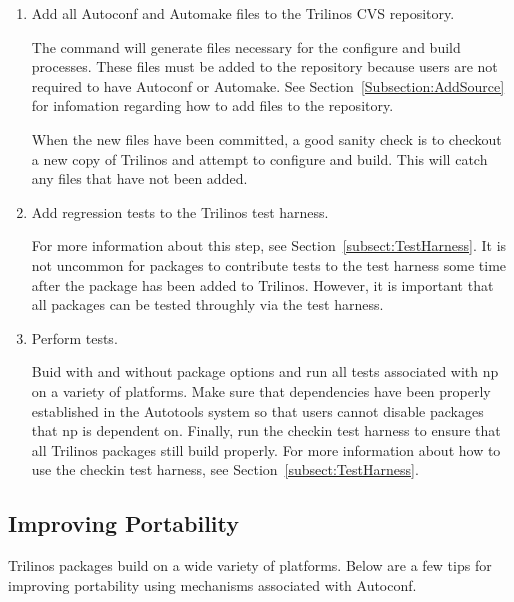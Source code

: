 \documentclass[12pt,relax]{TrilinosDevGuide}
\begin{document}
\begin{enumerate}
\begin{itemize}
\end{itemize}

\item Add all Autoconf and Automake files to the Trilinos CVS repository.

The  command will generate files necessary for the 
configure and build processes.  These files must be added to the repository 
because users are not required to have Autoconf or Automake.  See 
Section~\ref{Subsection:AddSource} for infomation regarding how to add files 
to the repository.

When the new files have been committed, a good sanity check is to checkout 
a new copy of Trilinos and attempt to configure and build.  This will catch 
any files that have not been added.

\item Add regression tests to the Trilinos test harness.

For more information about this step, see Section~\ref{subsect:TestHarness}.
It is not uncommon for packages to contribute tests to the test harness some 
time after the package has been added to Trilinos.  However, it is important 
that all packages can be tested throughly via the test harness.

\item Perform tests.

Buid with and without package options and run all tests associated with np on 
a variety of platforms.  Make sure that dependencies have been properly 
established in the Autotools system so that users cannot disable packages that 
np is dependent on.  Finally, run the checkin test harness to ensure that 
all Trilinos packages still build properly.  For more information about how 
to use the checkin test harness, see Section~\ref{subsect:TestHarness}.

\end{enumerate}

\subsection{Improving Portability}

Trilinos packages build on a wide variety of platforms.  Below are a few tips 
for improving portability using mechanisms associated with Autoconf.
\end{document}
